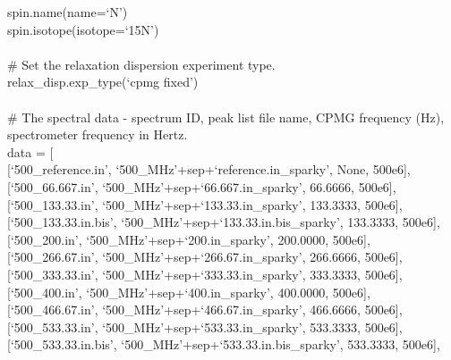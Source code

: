\begin{exampleenv}
spin.name(name=`N') \\
spin.isotope(isotope=`15N') \\
 \\
\# Set the relaxation dispersion experiment type. \\
relax\_disp.exp\_type(`cpmg fixed') \\
 \\
\# The spectral data - spectrum ID, peak list file name, CPMG frequency (Hz), spectrometer frequency in Hertz. \\
data = [ \\
\hspace*{4ex} [`500\_reference.in',    `500\_MHz'+sep+`reference.in\_sparky',           None,  500e6], \\
\hspace*{4ex} [`500\_66.667.in',       `500\_MHz'+sep+`66.667.in\_sparky',           66.6666,  500e6], \\
\hspace*{4ex} [`500\_133.33.in',       `500\_MHz'+sep+`133.33.in\_sparky',          133.3333,  500e6], \\
\hspace*{4ex} [`500\_133.33.in.bis',   `500\_MHz'+sep+`133.33.in.bis\_sparky',      133.3333,  500e6], \\
\hspace*{4ex} [`500\_200.in',          `500\_MHz'+sep+`200.in\_sparky',             200.0000,  500e6], \\
\hspace*{4ex} [`500\_266.67.in',       `500\_MHz'+sep+`266.67.in\_sparky',          266.6666,  500e6], \\
\hspace*{4ex} [`500\_333.33.in',       `500\_MHz'+sep+`333.33.in\_sparky',          333.3333,  500e6], \\
\hspace*{4ex} [`500\_400.in',          `500\_MHz'+sep+`400.in\_sparky',             400.0000,  500e6], \\
\hspace*{4ex} [`500\_466.67.in',       `500\_MHz'+sep+`466.67.in\_sparky',          466.6666,  500e6], \\
\hspace*{4ex} [`500\_533.33.in',       `500\_MHz'+sep+`533.33.in\_sparky',          533.3333,  500e6], \\
\hspace*{4ex} [`500\_533.33.in.bis',   `500\_MHz'+sep+`533.33.in.bis\_sparky',      533.3333,  500e6], \\

\end{exampleenv}
